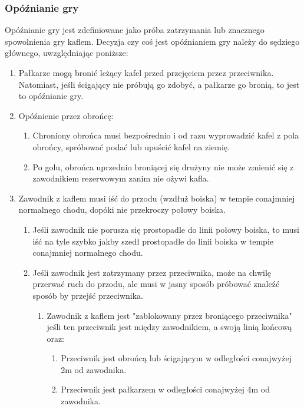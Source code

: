 \documentclass[11pt,a4paper]{article}
\begin{document}
\subsubsection{Opóźnianie gry}
Opóźnianie gry jest zdefiniowane jako próba zatrzymania lub znacznego spowolnienia gry kaflem. Decyzja czy coś jest opóźnianiem gry należy do sędziego głównego, uwzględniając poniższe:
\begin{enumerate}
  \item Pałkarze mogą bronić leżący kafel przed przejęciem przez przeciwnika. Natomiast, jeśli ścigający nie próbują go zdobyć, a pałkarze go bronią, to jest to opóźnianie gry.
  \item Opóźnienie przez obrońcę:
  \begin{enumerate}
    \item Chroniony obrońca musi bezpośrednio i od razu wyprowadzić kafel z pola obrońcy, spróbować podać lub upuścić kafel na ziemię.
    \item Po golu, obrońca uprzednio broniącej się drużyny nie może zmienić się z zawodnikiem rezerwowym zanim nie ożywi kafla.
  \end{enumerate}
  \item Zawodnik z kaflem musi iść do przodu (wzdłuż boiska) w tempie conajmniej normalnego chodu, dopóki nie przekroczy połowy boiska.
  \begin{enumerate}
    \item Jeśli zawodnik nie porusza się prostopadle do linii połowy boiska, to musi iść na tyle szybko jakby szedł prostopadle do linii boiska w tempie conajmniej normalnego chodu.
    \item Jeśli zawodnik jest zatrzymany przez przeciwnika, może na chwilę przerwać ruch do przodu, ale musi w jasny sposób próbować znaleźć sposób by przejść przeciwnika.
    \begin{enumerate}
      \item Zawodnik z kaflem jest "zablokowany przez broniącego przeciwnika" jeśli ten przeciwnik jest między zawodnikiem, a swoją linią końcową oraz:
      \begin{enumerate}
        \item Przeciwnik jest obrońcą lub ścigającym w odległości conajwyżej 2m od zawodnika.
        \item Przeciwnik jest pałkarzem w odległości conajwyżej 4m od zawodnika.
      \end{enumerate}
    \end{enumerate}
  \end{enumerate}

\end{enumerate}
\end{document}
